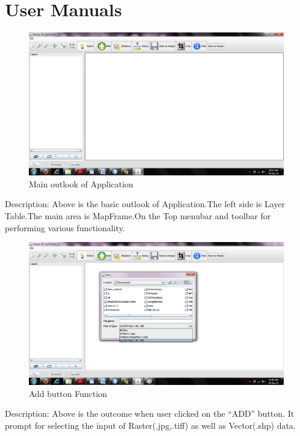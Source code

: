 \chapter{User Manuals}

\begin{figure}[h]
\begin{center}
  \includegraphics[scale=0.43] {1.jpg}
  \caption[Screenshot - Outlook]{Main outlook of Application}
\end{center}
\end{figure}
Description: Above is the basic outlook of Application.The left side is Layer Table.The main area is MapFrame.On the Top menubar and toolbar for performing various functionality.

\newpage
\begin{figure}[h]
\begin{center}
  \includegraphics[scale=0.43] {2.jpg}
  \caption[Screenshot - Add Layer]{Add button Function}
\end{center}
\end{figure}
Description: Above is the outcome when user clicked on the “ADD” button. It prompt for selecting the input of Raster(.jpg,.tiff) as well as Vector(.shp) data.

